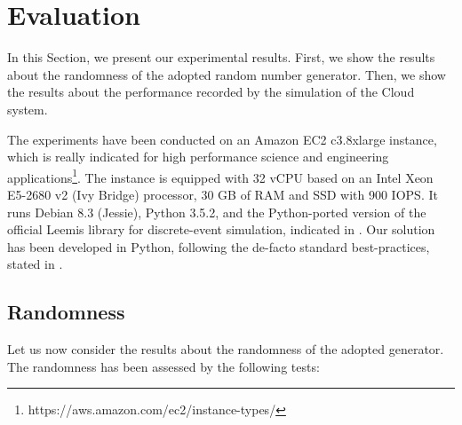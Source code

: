 \section{Evaluation}
\label{sec:evaluation}

In this Section, we present our experimental results.
First, we show the results about the randomness of the adopted random number generator.
Then, we show the results about the performance recorded by the simulation of the Cloud system.

The experiments have been conducted on an Amazon EC2 c3.8xlarge instance, which is really indicated for high performance science and engineering applications\footnote{https://aws.amazon.com/ec2/instance-types/}.
The instance is equipped with 32 vCPU based on an Intel Xeon E5-2680 v2 (Ivy Bridge) processor, 30 GB of RAM and SSD with 900 IOPS.
It runs Debian 8.3 (Jessie), Python 3.5.2, and the Python-ported version of the official Leemis library for discrete-event simulation, indicated in \cite{leemis2006discrete}.
Our solution has been developed in Python, following the de-facto standard best-practices, stated in \cite{reitz2016,GooglePythonStyleguide}.

\subsection{Randomness}
Let us now consider the results about the randomness of the adopted generator.
The randomness has been assessed by the following tests:

